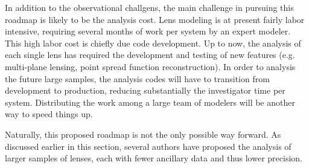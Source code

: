 In addition to the observational challgens, the main challenge in
pursuing this roadmap is likely to be the analysis cost. Lens modeling
is at present fairly labor intensive, requiring several months of work
per system by an expert modeler. This high labor cost is chiefly due
code development. Up to now, the analysis of each single lens has
required the development and testing of new features (e.g. multi-plane
lensing, point spread function reconstruction). In order to analysis
the future large samples, the analysis codes will have to transition
from development to production, reducing substantially the
investigator time per system. Distributing the work among a large team
of modelers will be another way to speed things up.

Naturally, this proposed roadmap is not the only possible way
forward. As discussed earlier in this section, several authors have
proposed the analysis of larger samples of lenses, each with fewer
ancillary data and thus lower precision.
